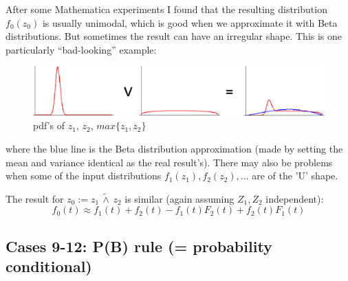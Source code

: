 After some Mathematica experiments I found that the resulting distribution $f_0(z_0)$ is usually unimodal, which is good when we approximate it with Beta distributions.  But sometimes the result can have an irregular shape.  This is one particularly ``bad-looking'' example:
\begin{figure}[H]
\centering
\includegraphics[scale=1.0]{A-max-B--ugly-pdf.eps}
\caption{pdf's of $z_1$, $z_2$, $max\{z_1,z_2\}$}
\end{figure}
where the blue line is the Beta distribution approximation (made by setting the mean and variance identical as the real result's).  There may also be problems when some of the input distributions $f_1(z_1),f_2(z_2),...$ are of the 'U' shape.


The result for $z_0 := z_1 \, \widetilde{\wedge} \, z_2$ is similar (again assuming $Z_1, Z_2$ independent):
\begin{equation}
f_0(t) \approx f_1(t) + f_2(t) - f_1(t) F_2(t) + f_2(t) F_1(t)
\end{equation}

\subsection{Cases 9-12: P(B) rule (= probability conditional)}

